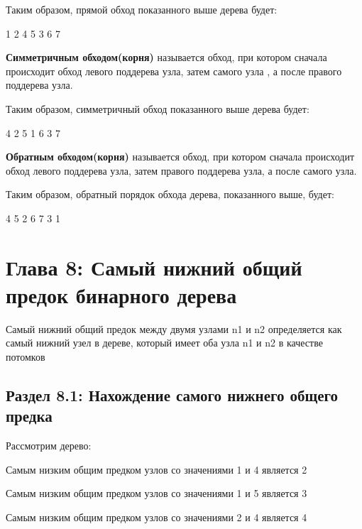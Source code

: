 \vspace{\baselineskip}
Таким образом, прямой обход показанного выше дерева будет:

\vspace{\baselineskip}
1 2 4 5 3 6 7

\vspace{\baselineskip}
\textbf{Симметричным обходом(корня)} называется обход, при котором сначала происходит обход левого поддерева узла, затем самого узла , а после  правого поддерева узла.

\vspace{\baselineskip}
Таким образом, симметричный обход показанного выше дерева будет:

\vspace{\baselineskip}
4 2 5 1 6 3 7

\vspace{\baselineskip}
\textbf{Обратным обходом(корня)} называется обход, при котором сначала происходит обход левого поддерева узла, затем правого поддерева узла, а после самого узла.

\vspace{\baselineskip}
Таким образом, обратный порядок обхода дерева, показанного выше, будет:

\vspace{\baselineskip}
4 5 2 6 7 3 1

\chapter*{Глава 8: Самый нижний общий предок бинарного дерева}
\vspace{-0.4cm}
Самый нижний общий предок между двумя узлами n1 и n2 определяется как самый нижний узел в дереве, который имеет оба узла n1 и n2 в качестве потомков

\section*{Раздел 8.1: Нахождение самого нижнего общего предка}
Рассмотрим дерево:


Самым низким общим предком  узлов со значениями 1 и 4 является 2

\vspace{\baselineskip}
Самым низким общим предком  узлов со значениями 1 и 5 является 3

\vspace{\baselineskip}
Самым низким общим предком   узлов со значениями 2 и 4 является 4

